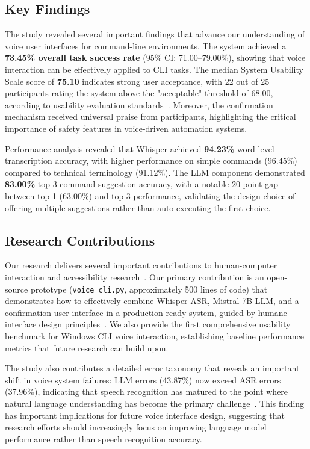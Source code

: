 \documentclass[a4paper,12pt]{article}
\begin{document}
\subsection{Key Findings}

The study revealed several important findings that advance our understanding of voice user interfaces for command-line environments. The system achieved a \textbf{73.45\% overall task success rate} (95\% CI: 71.00–79.00\%), showing that voice interaction can be effectively applied to CLI tasks. The median System Usability Scale score of \textbf{75.10} indicates strong user acceptance, with 22 out of 25 participants rating the system above the "acceptable" threshold of 68.00, according to usability evaluation standards~\cite{ref15}. Moreover, the confirmation mechanism received universal praise from participants, highlighting the critical importance of safety features in voice-driven automation systems.

Performance analysis revealed that Whisper achieved \textbf{94.23\%} word-level transcription accuracy, with higher performance on simple commands (96.45\%) compared to technical terminology (91.12\%). The LLM component demonstrated \textbf{83.00\%} top-3 command suggestion accuracy, with a notable 20-point gap between top-1 (63.00\%) and top-3 performance, validating the design choice of offering multiple suggestions rather than auto-executing the first choice.

\subsection{Research Contributions}

Our research delivers several important contributions to human-computer interaction and accessibility research~\cite{ref16,ref22}. Our primary contribution is an open-source prototype (\texttt{voice\_cli.py}, approximately 500 lines of code) that demonstrates how to effectively combine Whisper ASR, Mistral-7B LLM, and a confirmation user interface in a production-ready system, guided by humane interface design principles~\cite{ref20}. We also provide the first comprehensive usability benchmark for Windows CLI voice interaction, establishing baseline performance metrics that future research can build upon.

The study also contributes a detailed error taxonomy that reveals an important shift in voice system failures: LLM errors (43.87\%) now exceed ASR errors (37.96\%), indicating that speech recognition has matured to the point where natural language understanding has become the primary challenge~\cite{ref14}. This finding has important implications for future voice interface design, suggesting that research efforts should increasingly focus on improving language model performance rather than speech recognition accuracy.
\end{document}
